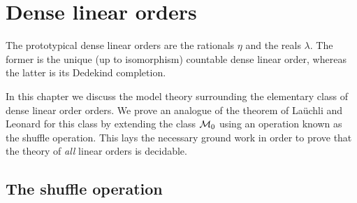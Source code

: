 
\chapter{Dense linear orders}

The prototypical dense linear orders are the rationals $\eta$ and the reals
$\lambda$.  The former is the unique (up to isomorphism) countable dense linear
order, whereas the latter is its Dedekind completion.

In this chapter we discuss the model theory surrounding the elementary class of
dense linear order orders.  We prove an analogue of the theorem of La\"uchli and
Leonard for this class by extending the class $\mathcal{M}_0$ using an operation known
as the shuffle operation.  This lays the necessary ground work in order to prove
that the theory of \textit{all} linear orders is decidable.

\section{The shuffle operation}

